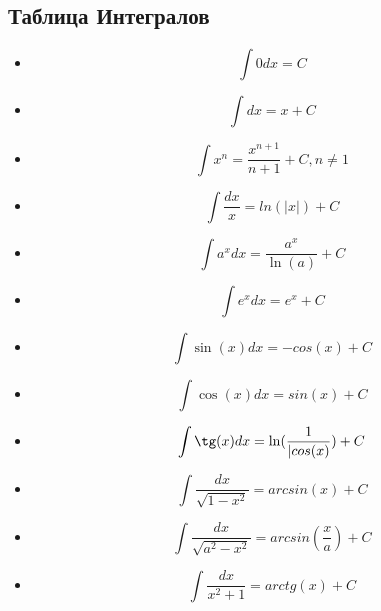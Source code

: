\documentclass[oneside]{book}
\begin{document}
\begin{itemize}
\begin{enumerate}
\section{Таблица Интегралов\\}
\begin{itemize}
  \item \begin{equation}
    \int 0 dx = C
  \end{equation}
  \item \begin{equation}
    \int dx = x + C
  \end{equation}
  \item \begin{equation}
    \int x^n = \frac{x^{n+1}}{n+1}+C, n \neq 1
  \end{equation}
  \item \begin{equation}
    \int \frac{dx}{x} = ln(|x|) + C
  \end{equation}
  \item \begin{equation}
    \int a^x dx = \frac{a^x}{\ln(a)} + C
  \end{equation}
  \item \begin{equation}
    \int e^x dx = e^x + C
  \end{equation}
  \item \begin{equation}
    \int \sin(x) dx = -cos(x) + C
  \end{equation}
  \item \begin{equation}
    \int \cos(x) dx = sin(x) + C
  \end{equation}
  \item \begin{equation}
    \int \tg(x) dx = \ln(\frac{1}{|cos(x)}) + C
  \end{equation}
  \item \begin{equation}
    \int \frac{dx}{\sqrt{1 - x^2}} = arcsin(x) + C
  \end{equation}
  \item \begin{equation}
    \int \frac{dx}{\sqrt{a^2 - x^2}} = arcsin(\frac{x}{a}) + C
  \end{equation}
  \item \begin{equation}
    \int \frac{dx}{x^2 + 1} = arctg(x) + C

\end{equation}
\end{itemize}
\end{enumerate}
\end{itemize}
\end{document}
